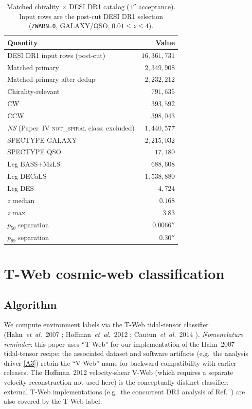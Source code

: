\documentclass[aps,prd,twocolumn,superscriptaddress,showpacs,preprintnumbers,nofootinbib,longbibliography,floatfix]{revtex4-2}
\newcommand{\repoBase}{https://github.com/Hubify-Projects/bigbounce/blob/main}
\begin{document}
\begin{table}[t]
\caption{Matched chirality $\times$ DESI DR1 catalog ($1''$
acceptance). Input rows are the post-cut DESI DR1 selection
(\texttt{ZWARN=0}, GALAXY/QSO, $0.01 \le z \le 4$).}
\label{tab:match_summary}
\begin{ruledtabular}
\begin{tabular}{lr}
Quantity & Value \\
\hline
DESI DR1 input rows (post-cut) & $16{,}361{,}731$ \\
Matched primary & $2{,}349{,}908$ \\
Matched primary after dedup & $2{,}232{,}212$ \\
Chirality-relevant & $791{,}635$ \\
\quad CW & $393{,}592$ \\
\quad CCW & $398{,}043$ \\
\quad \emph{NS} (Paper~IV \textsc{not\_spiral} class; excluded) & $1{,}440{,}577$ \\
SPECTYPE GALAXY & $2{,}215{,}032$ \\
SPECTYPE QSO & $17{,}180$ \\
Leg BASS+MzLS & $688{,}608$ \\
Leg DECaLS & $1{,}538{,}880$ \\
Leg DES & $4{,}724$ \\
$z$ median & $0.168$ \\
$z$ max & $3.83$ \\
$p_{50}$ separation & $0.0066''$ \\
$p_{99}$ separation & $0.30''$ \\
\end{tabular}
\end{ruledtabular}
\end{table}

\section{T-Web cosmic-web classification}\label{sec:vweb}

\subsection{Algorithm}\label{sec:vweb_algo}

We compute environment labels via the T-Web tidal-tensor classifier
(Hahn~\textit{et~al.}~2007 \cite{Hahn2007};
Hoffman~\textit{et~al.}~2012 \cite{Hoffman2012};
Cautun~\textit{et~al.}~2014 \cite{Cautun2014}).
\emph{Nomenclature reminder}: this
paper uses ``T-Web'' for our implementation of the Hahn~2007
tidal-tensor recipe; the associated dataset and software artifacts (e.g.\ the
analysis driver
\href{\repoBase/pipelines/p5\_desi\_chirality/env\_finder/01\_compute\_vweb.py}{[A3]})
retain the ``V-Web'' name for backward compatibility with earlier
releases. The Hoffman~2012 velocity-shear V-Web (which requires a separate
velocity reconstruction not used here) is the conceptually distinct
classifier; external T-Web implementations (e.g.\ the concurrent
DR1 analysis of Ref.~\cite{TWebDESI2026}) are also covered by the
T-Web label.
\end{document}
